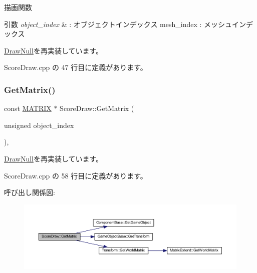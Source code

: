 描画関数 


\begin{DoxyParams}{引数}
{\em object\+\_\+index} & \+: オブジェクトインデックス mesh\+\_\+index \+: メッシュインデックス \\
\hline
\end{DoxyParams}


\mbox{\hyperlink{class_draw_null_afe50f6fd820b18d673f70f048743f339}{Draw\+Null}}を再実装しています。



 Score\+Draw.\+cpp の 47 行目に定義があります。

\mbox{\label{class_score_draw_a62aa20ef4b40544bf0a95770b925c780}} 
\subsubsection{\texorpdfstring{Get\+Matrix()}{GetMatrix()}}
{\footnotesize\ttfamily const \mbox{\hyperlink{_vector3_d_8h_a032295cd9fb1b711757c90667278e744}{M\+A\+T\+R\+IX}} $\ast$ Score\+Draw\+::\+Get\+Matrix (\begin{DoxyParamCaption}\item[{unsigned}]{object\+\_\+index }\end{DoxyParamCaption})\hspace{0.3cm}{\ttfamily [override]}, {\ttfamily [virtual]}}



\mbox{\hyperlink{class_draw_null_adede079e9c11a756090740b20bb43022}{Draw\+Null}}を再実装しています。



 Score\+Draw.\+cpp の 58 行目に定義があります。

呼び出し関係図\+:\nopagebreak
\begin{figure}[H]
\begin{center}
\leavevmode
\includegraphics[width=350pt]{class_score_draw_a62aa20ef4b40544bf0a95770b925c780_cgraph}
\end{center}
\end{figure}
\mbox{\label{class_score_draw_af013abb96136825e71d4fee06529fc69}} 
